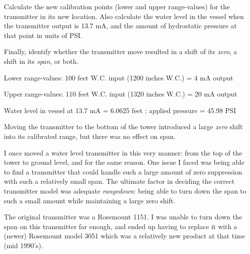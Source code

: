 Calculate the new calibration points (lower and upper range-values) for the transmitter in its new location.  Also calculate the water level in the vessel when the transmitter output is 13.7 mA, and the amount of hydrostatic pressure at that point in units of PSI.

\vskip 10pt

Finally, identify whether the transmitter move resulted in a shift of its {\it zero}, a shift in its {\it span}, or both.







Lower range-values: 100 feet W.C. input (1200 inches W.C.) = 4 mA output

Upper range-values: 110 feet W.C. input (1320 inches W.C.) = 20 mA output

\vskip 10pt

Water level in vessel at 13.7 mA = 6.0625 feet ; applied pressure = 45.98 PSI







Moving the transmitter to the bottom of the tower introduced a large {\it zero} shift into its calibrated range, but there was no effect on span.

\vskip 10pt

I once moved a water level transmitter in this very manner: from the top of the tower to ground level, and for the same reason.  One issue I faced was being able to find a transmitter that could handle such a large amount of zero suppression with such a relatively small span.  The ultimate factor in deciding the correct transmitter model was adequate {\it rangedown}: being able to turn down the span to such a small amount while maintaining a large zero shift.

The original transmitter was a Rosemount 1151.  I was unable to turn down the span on this transmitter far enough, and ended up having to replace it with a (newer) Rosemount model 3051 which was a relatively new product at that time (mid 1990's).




